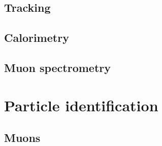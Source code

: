 \subsection{Tracking}
\subsection{Calorimetry}
\subsection{Muon spectrometry}

\section{Particle identification}
\label{sec:particles}

\subsection{Muons}

